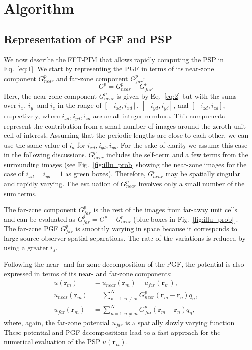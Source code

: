\documentclass{article}
\begin{document}
\section{Algorithm} \label{sec:3}
\subsection{Representation of PGF and PSP} \label{ssec:3.1}
We now describe the FFT-PIM that allows rapidly computing the PSP in Eq.~\eqref{eq:1}. We start by representing the PGF in terms of its near-zone component $G_{near}^{p}$ and far-zone component $G^p_{far}$:
\begin{equation} \label{eq:4}
    G^p = G_{near}^{p} + G^p_{far}.
\end{equation}
Here, the near-zone component $G_{near}^{p}$ is given by Eq.~\eqref{eq:2} but with the sums over $i_x$, $i_y$, and $i_z$ in the range of $[-i_{xd},i_{xd}]$, $[-i_{yd},i_{yd}]$, and $[-i_{zd},i_{zd}]$, respectively, where $i_{xd},i_{yd},i_{zd}$ are small integer numbers. This components represent the contribution from a small number of images around the zeroth unit cell of interest. Assuming that the periodic lengths are close to each other, we can use the same value of $i_d$ for $i_{xd},i_{yd},i_{yd}$. For the sake of clarity we assume this case in the following discussions. $G_{near}^{p}$ includes the self-term and a few terms from the surrounding images (see Fig.~\ref{fig:illu_prob} showing the near-zone images for the case of $i_{xd}=i_{yd}=1$ as green boxes). Therefore, $G_{near}^{p}$ may be spatially singular and rapidly varying. The evaluation of $G_{near}^{p}$ involves only a small number of the sum terms. 

The far-zone component $G_{far}^{p}$ is the rest of the images from far-away unit cells and can be evaluated as $G^p_{far} = G^p - G_{near}^{p}$ (blue boxes in Fig.~\ref{fig:illu_prob}). The far-zone PGF $G_{far}^{p}$ is smoothly varying in space because it corresponds to large source-observer spatial separations. The rate of the variations is reduced by using a greater $i_d$.

Following the near- and far-zone decomposition of the PGF, the potential is also expressed in terms of its near- and far-zone components:
\begin{equation} \label{eq:5}
    \begin{split}
        u(\mathbf{r}_m)& = u_{near}(\mathbf{r}_m)+u_{far}(\mathbf{r}_m),\\
        u_{near}(\mathbf{r}_m)&=\sum_{n=1,n\neq m}^NG_{near}^{p}(\mathbf{r}_m- \mathbf{r}_n)q_n,\\
        u_{far}(\mathbf{r}_m)&=\sum_{n=1,n\neq m}^NG^p_{far}(\mathbf{r}_m- \mathbf{r}_n)q_n,
    \end{split}
\end{equation}
where, again, the far-zone potential $u_{far}$ is a spatially slowly varying function. These potential and PGF decompositions lead to a fast approach for the numerical evaluation of the PSP $u(\mathbf{r}_m)$.
\end{document}
